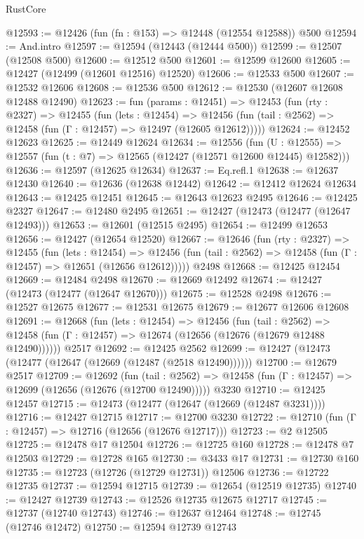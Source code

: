 \begin{lexlean}{RustCore}
\begin{coremodule}
@12593 := @12426 (fun (fn : @153) => @12448 (@12554 @12588)) @500
@12594 := And.intro
@12597 := @12594 (@12443 (@12444 @500))
@12599 := @12507 (@12508 @500)
@12600 := @12512 @500
@12601 := @12599 @12600
@12605 := @12427 (@12499 (@12601 @12516) @12520)
@12606 := @12533 @500
@12607 := @12532 @12606
@12608 := @12536 @500
@12612 := @12530 (@12607 @12608 @12488 @12490)
@12623 := fun (params : @12451) =>
  @12453
    (fun (rty : @2327) =>
    @12455
      (fun (lets : @12454) =>
      @12456 (fun (tail : @2562) => @12458 (fun (Γ : @12457) => @12497 (@12605 @12612)))))
@12624 := @12452 @12623
@12625 := @12449 @12624
@12634 := @12556
    (fun (U : @12555) => @12557 (fun (t : @7) => @12565 (@12427 (@12571 @12600 @12445) @12582)))
@12636 := @12597 (@12625 @12634)
@12637 := Eq.refl.{1}
@12638 := @12637 @12430
@12640 := @12636 (@12638 @12442)
@12642 := @12412 @12624 @12634
@12643 := @12425 @12451
@12645 := @12643 @12623 @2495
@12646 := @12425 @2327
@12647 := @12480 @2495
@12651 := @12427 (@12473 (@12477 (@12647 @12493)))
@12653 := @12601 (@12515 @2495)
@12654 := @12499 @12653
@12656 := @12427 (@12654 @12520)
@12667 := @12646
    (fun (rty : @2327) =>
    @12455
      (fun (lets : @12454) =>
      @12456 (fun (tail : @2562) => @12458 (fun (Γ : @12457) => @12651 (@12656 @12612)))))
    @2498
@12668 := @12425 @12454
@12669 := @12484 @2498
@12670 := @12669 @12492
@12674 := @12427 (@12473 (@12477 (@12647 @12670)))
@12675 := @12528 @2498
@12676 := @12527 @12675
@12677 := @12531 @12675
@12679 := @12677 @12606 @12608
@12691 := @12668
    (fun (lets : @12454) =>
    @12456
      (fun (tail : @2562) =>
      @12458 (fun (Γ : @12457) => @12674 (@12656 (@12676 (@12679 @12488 @12490))))))
    @2517
@12692 := @12425 @2562
@12699 := @12427 (@12473 (@12477 (@12647 (@12669 (@12487 (@2518 @12490))))))
@12700 := @12679 @2517
@12709 := @12692
    (fun (tail : @2562) => @12458 (fun (Γ : @12457) => @12699 (@12656 (@12676 (@12700 @12490)))))
    @3230
@12710 := @12425 @12457
@12715 := @12473 (@12477 (@12647 (@12669 (@12487 @3231))))
@12716 := @12427 @12715
@12717 := @12700 @3230
@12722 := @12710 (fun (Γ : @12457) => @12716 (@12656 (@12676 @12717)))
@12723 := @2 @12505
@12725 := @12478 @17 @12504
@12726 := @12725 @160
@12728 := @12478 @7 @12503
@12729 := @12728 @165
@12730 := @3433 @17
@12731 := @12730 @160
@12735 := @12723 (@12726 (@12729 @12731)) @12506
@12736 := @12722 @12735
@12737 := @12594 @12715
@12739 := @12654 (@12519 @12735)
@12740 := @12427 @12739
@12743 := @12526 @12735 @12675 @12717
@12745 := @12737 (@12740 @12743)
@12746 := @12637 @12464
@12748 := @12745 (@12746 @12472)
@12750 := @12594 @12739 @12743

\end{coremodule}
\end{lexlean}

